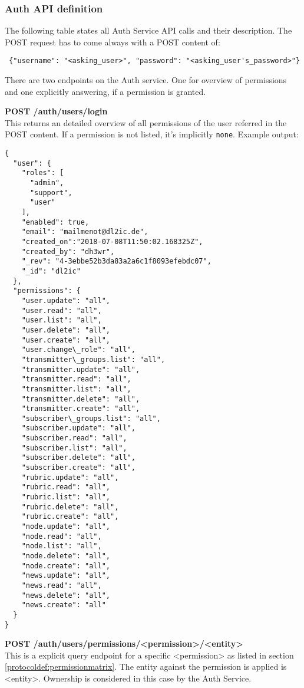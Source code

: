 \newpage
\subsubsection{Auth API definition}
\label{protocoldef:auth:api}
The following table states all Auth Service API calls and their description. The POST request has to come always with a POST content of:
\begin{lstlisting}
 {"username": "<asking_user>", "password": "<asking_user's_password>"}
\end{lstlisting}

There are two endpoints on the Auth service. One for overview of permissions and one explicitly answering, if a permission is granted.

\textbf{POST /auth/users/login}\\
This returns an detailed overview of all permissions of the user referred in the POST content. If a permission is not listed, it's implicitly \verb|none|. Example output:
\begin{lstlisting}
{
  "user": {
    "roles": [
      "admin",
      "support",
      "user"
    ],
    "enabled": true,
    "email": "mailmenot@dl2ic.de",
    "created_on":"2018-07-08T11:50:02.168325Z",
    "created_by": "dh3wr",
    "_rev": "4-3ebbe52b3da83a2a6c1f8093efebdc07",
    "_id": "dl2ic"
  },
  "permissions": {
    "user.update": "all",
    "user.read": "all",
    "user.list": "all",
    "user.delete": "all",
    "user.create": "all",
    "user.change\_role": "all",
    "transmitter\_groups.list": "all",
    "transmitter.update": "all",
    "transmitter.read": "all",
    "transmitter.list": "all",
    "transmitter.delete": "all",
    "transmitter.create": "all",
    "subscriber\_groups.list": "all",
    "subscriber.update": "all",
    "subscriber.read": "all",
    "subscriber.list": "all",
    "subscriber.delete": "all",
    "subscriber.create": "all",
    "rubric.update": "all",
    "rubric.read": "all",
    "rubric.list": "all",
    "rubric.delete": "all",
    "rubric.create": "all",
    "node.update": "all",
    "node.read": "all",
    "node.list": "all",
    "node.delete": "all",
    "node.create": "all",
    "news.update": "all",
    "news.read": "all",
    "news.delete": "all",
    "news.create": "all"
  }
}
\end{lstlisting}

\textbf{POST /auth/users/permissions/<permission>/<entity>}\\
This is a explicit query endpoint for a specific <permission> as listed in section \ref{protocoldef:permissionmatrix}. The entity against the permission is applied is <entity>. Ownership  is considered in this case by the Auth Service.

